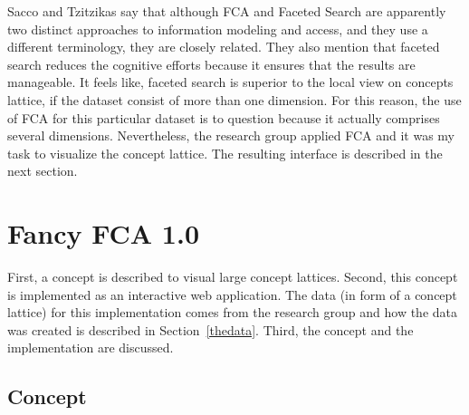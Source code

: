 \documentclass[11pt]{report}
\begin{document}
Sacco and Tzitzikas \cite{Sacco2009} say that although FCA and Faceted Search are apparently two distinct approaches to information modeling and access, and they use a different terminology, they are closely related. They also mention that faceted search reduces the cognitive efforts because it ensures that the results are manageable. It feels like, faceted search is superior to the local view on concepts lattice, if the dataset consist of more than one dimension. For this reason, the use of FCA for this particular dataset is to question because it actually comprises several dimensions. Nevertheless, the research group applied FCA and it was my task to visualize the concept lattice. The resulting interface is described in the next section.
\chapter{Fancy FCA 1.0}
\label{Fancy 1.0}

First, a concept is described to visual large concept lattices. Second, this concept is implemented as an interactive web application. The data (in form of a concept lattice) for this implementation comes from the research group and how the data was created is described in Section~\ref{thedata}. Third, the concept and the implementation are discussed.

\section{Concept}
\end{document}
